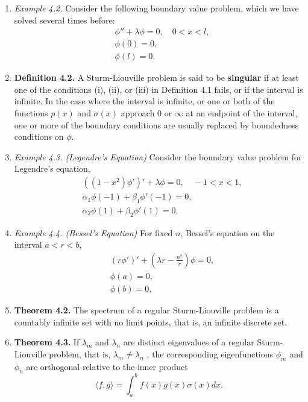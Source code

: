 \begin{enumerate}
\item \textit{Example 4.2.} Consider the following boundary value problem, which we have
solved several times before:
\begin{align*}
& \phi '' + \lambda \phi = 0, \quad 0 < x < l,\\
& \phi(0) = 0, \\
& \phi(l) = 0.
\end{align*}


\newpage


\item \textbf{Definition 4.2.} A Sturm-Liouville problem is said to be \textbf{singular} if at least one of the conditions (i), (ii), or (iii) in Definition 4.1 fails, or if the interval is infinite. In the case where the interval is infinite, or one or both of the functions $p(x)$ and $\sigma(x)$ approach $0$ or $\infty$ at an endpoint of the interval, one or more of the boundary conditions are usually replaced by boundedness conditions on $\phi$.

\item \textit{Example 4.3. (Legendre's Equation)} Consider the boundary value problem for Legendre’s equation,
\begin{align*}
& ((1-x^2)\phi ' ) ' + \lambda \phi = 0, \quad -1 < x < 1,\\
& \alpha _1 \phi(-1) + \beta _1 \phi ' (-1) = 0, \\
& \alpha _2 \phi(1) + \beta _2 \phi ' (1) = 0,
\end{align*}


\vspace{150pt}


\item \textit{Example 4.4. (Bessel's Equation)} For fixed $n$, Bessel’s equation on the interval $a < r < b$,
\begin{align*}
& (r\phi ' ) ' + \left( \lambda r - \frac{n^2}{r} \right) \phi = 0,\\
& \phi(a) = 0, \\
& \phi(b) = 0,
\end{align*}



\newpage


\item \textbf{Theorem 4.2.} The spectrum of a regular Sturm-Liouville problem is a countably infinite set with no limit points, that is, an infinite discrete set.


\item \textbf{Theorem 4.3.} If $\lambda _m$ and $\lambda _n$ are distinct eigenvalues of a regular Sturm-Liouville problem, that is, $\lambda _m \neq \lambda _n$ , the corresponding eigenfunctions $\phi _m$
and $\phi _n$ are orthogonal relative to the inner product
\[\langle f, g\rangle = \int_{a}^{b} f (x)g(x) \sigma (x) dx.\]



\end{enumerate}

